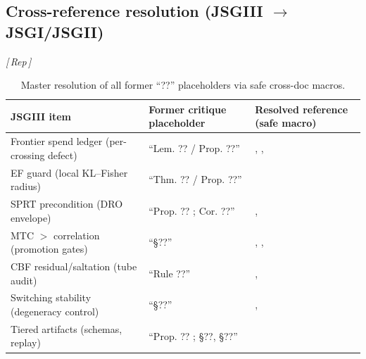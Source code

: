 \documentclass[10pt]{article}
\makeatletter
\newcommand{\layertag}[1]{\textsf{\footnotesize[\,#1\,]}}
\newcommand{\JSGxrefDual}[3]{%
  \@ifundefined{r@#3}{%
    \@ifundefined{r@#1-#3}{\textbf{[#2 ??]}}{#2~\ref{#1-#3}}%
  }{#2~\ref{#3}}%
}
\newcommand{\jsgiLem}[1]{\JSGxrefDual{JSGI}{JSGI Lemma}{#1}}
\newcommand{\jsgiThm}[1]{\JSGxrefDual{JSGI}{JSGI Theorem}{#1}}
\newcommand{\jsgiiLem}[1]{\JSGxrefDual{JSGII}{JSGII Lemma}{#1}}
\newcommand{\jsgiiThm}[1]{\JSGxrefDual{JSGII}{JSGII Theorem}{#1}}
\newcommand{\jsgiiDef}[1]{\JSGxrefDual{JSGII}{JSGII Definition}{#1}}
\newcommand{\jsgiiSec}[1]{\JSGxrefDual{JSGII}{JSGII §}{#1}}
\def\lblNoZeno{lem:no-zeno}
\def\lblJacobiDefect{lem:jacobi-defect}
\def\lblISS{thm:iss-passivity}
\def\lblEFradius{thm:ef-kl-cumulant}
\def\lblDROenv{thm:dro-envelope}
\def\lblQuarantine{def:window-quarantine}
\def\lblMTC{def:mtc}
\def\lblIVbadge{def:iv-badge}
\def\lblSaltation{lem:numeric-saltation}
\def\lblCBFfrontier{lem:frontier-cbf}
\def\lblGapGate{lem:gap-gate}
\def\lblSwitchStab{thm:switching-stability}
\def\lblSchemas{sec:artifact-schemas}
\def\lblCoverage{sec:coverage-kpi}
\makeatother
\begin{document}
\subsection{Cross-reference resolution (JSGIII $\rightarrow$ JSGI/JSGII)}\label{app:resolution-xref}
\emph{\layertag{Rep}}
\begin{table}[h]
\centering
\renewcommand{\arraystretch}{1.12}
\begin{tabularx}{\textwidth}{@{}>{\raggedright\arraybackslash}X >{\raggedright\arraybackslash}X >{\raggedright\arraybackslash}X@{}}
\toprule
\textbf{JSGIII item} & \textbf{Former critique placeholder} & \textbf{Resolved reference (safe macro)} \\
\midrule
Frontier spend ledger (per-crossing defect) &
“Lem. ?? / Prop. ??” &
\jsgiLem{\lblNoZeno}, \jsgiLem{\lblJacobiDefect}, \jsgiThm{\lblISS} \\
EF guard (local KL–Fisher radius) &
“Thm. ?? / Prop. ??” &
\jsgiiThm{\lblEFradius} \\
SPRT precondition (DRO envelope) &
“Prop. ?? ; Cor. ??” &
\jsgiiThm{\lblDROenv}, \jsgiiDef{\lblQuarantine} \\
MTC $>$ correlation (promotion gates) &
“§??” &
\jsgiiDef{\lblMTC}, \jsgiiDef{\lblIVbadge}, \jsgiiSec{\lblCoverage} \\
CBF residual/saltation (tube audit) &
“Rule ??” &
\jsgiiLem{\lblSaltation}, \jsgiiLem{\lblCBFfrontier} \\
Switching stability (degeneracy control) &
“§??” &
\jsgiiLem{\lblGapGate}, \jsgiiThm{\lblSwitchStab} \\
Tiered artifacts (schemas, replay) &
“Prop. ?? ; §??, §??” &
\jsgiiSec{\lblSchemas} \\
\bottomrule
\end{tabularx}
\caption{Master resolution of all former “??” placeholders via safe cross-doc macros.}
\label{tab:master-resolution}
\end{table}
\end{document}
